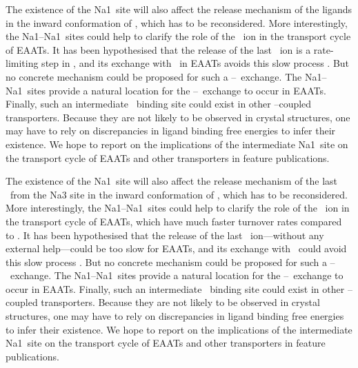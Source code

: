 The existence of the Na1\prim\ site will also affect the release mechanism of the ligands in the inward
conformation of \GltPh, which has to be reconsidered. More interestingly, the Na1--Na1\prim\ sites could 
help to clarify the role of the \K\ ion in the transport cycle of EAATs. It has been hypothesised that 
the release of the last \Na\ ion is a rate-limiting step in \GltPh, and its exchange with \K\ in EAATs 
avoids this slow process \cite{Heinzelmann2013,Heinzelmann2014a}. But no concrete mechanism could be 
proposed for such a \K--\Na\ exchange. The Na1--Na1\prim\ sites provide a natural location for the 
\K--\Na\ exchange to occur in EAATs. Finally, such an intermediate \Na\ binding site could exist in other 
\Na--coupled transporters. Because they are not likely to be observed in crystal structures, one may have 
to rely on discrepancies in ligand binding free energies to infer their existence. We hope to report on 
the implications of the intermediate Na1\prim\ site on the transport cycle of EAATs and other transporters 
in feature publications.

The existence of the Na1\prim\ site will also affect the release mechanism of the last \Na\ from the Na3 
site in the inward conformation of \GltPh, which has to be reconsidered. More interestingly, the 
Na1--Na1\prim\ sites could help to clarify the role of the \K\ ion in the transport cycle of EAATs, 
which have much faster turnover rates compared to \GltPh. It has been hypothesised that the release of the 
last \Na\ ion---without any external help---could be too slow for EAATs, and its exchange with \K\ could 
avoid this slow process \cite{Heinzelmann2014a}. But no concrete mechanism could be proposed for such a 
\K--\Na\ exchange. The Na1--Na1\prim\ sites provide a natural location for the \K--\Na\ exchange to occur 
in EAATs. Finally, such an intermediate \Na\ binding site could exist in other \Na--coupled transporters. 
Because they are not likely to be observed in crystal structures, one may have to rely on discrepancies 
in ligand binding free energies to infer their existence. We hope to report on the implications of the 
intermediate Na1\prim\ site on the transport cycle of EAATs and other transporters in feature publications.

